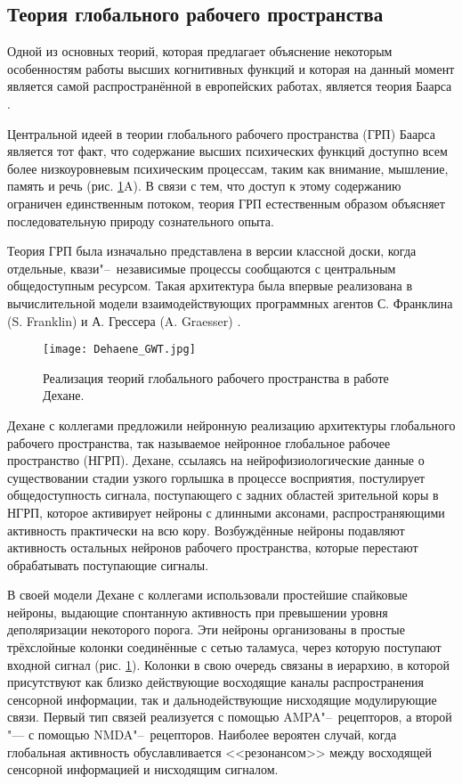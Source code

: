 \subsection{Теория глобального рабочего пространства}\label{subsect1_2_1}

Одной из основных теорий, которая предлагает объяснение некоторым особенностям работы высших когнитивных функций и которая на данный момент является самой распространённой в европейских работах, является теория Баарса \cite{Baars1988,Baars2005}.

Центральной идеей в теории глобального рабочего пространства (ГРП) Баарса является тот факт, что содержание высших психических функций доступно всем более низкоуровневым психическим процессам, таким как внимание, мышление, память и речь (рис. \ref{fg:dehaene_gwt}A). В связи с тем, что доступ к этому содержанию ограничен единственным потоком, теория ГРП естественным образом объясняет последовательную природу сознательного опыта.

Теория ГРП была изначально представлена в версии классной доски, когда отдельные, квази"--~независимые процессы сообщаются с центральным общедоступным ресурсом. Такая архитектура была впервые реализована в вычислительной модели взаимодействующих программных агентов С. Франклина (S. Franklin) и А. Грессера (A. Graesser) \cite{Franklin1999}.

\begin{figure}[h]
	\centering	
	\texttt{[image: Dehaene\_GWT.jpg]}
	\caption{Реализация теорий глобального рабочего пространства в работе Дехане.}
	\label{fg:dehaene_gwt}
\end{figure}

Дехане с коллегами \cite{Dehaene2003} предложили нейронную реализацию архитектуры глобального рабочего пространства, так называемое нейронное глобальное рабочее пространство (НГРП). Дехане, ссылаясь на нейрофизиологические данные о существовании стадии узкого горлышка в процессе восприятия, постулирует общедоступность сигнала, поступающего с задних областей зрительной коры в НГРП, которое активирует нейроны с длинными аксонами, распространяющими активность практически на всю кору. Возбуждённые нейроны подавляют активность остальных нейронов рабочего пространства, которые перестают обрабатывать поступающие сигналы. 

В своей модели Дехане с коллегами использовали простейшие спайковые нейроны, выдающие спонтанную активность при превышении уровня деполяризации некоторого порога. Эти нейроны организованы в простые трёхслойные колонки соединённые с сетью таламуса, через которую поступают входной сигнал (рис. \ref{fg:dehaene_gwt}). Колонки в свою очередь связаны в иерархию, в которой присутствуют как близко действующие восходящие каналы распространения сенсорной информации, так и дальнодействующие нисходящие модулирующие связи. Первый тип связей реализуется с помощью AMPA"--~рецепторов, а второй "--- с помощью NMDA"--~рецепторов. Наиболее вероятен случай, когда глобальная активность обуславливается <<резонансом>> между восходящей сенсорной информацией и нисходящим сигналом.


